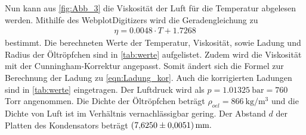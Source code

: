 Nun kann aus \autoref{fig:Abb_3} die Viskosität der Luft für die Temperatur abgelesen werden.
Mithilfe des WebplotDigitizers \cite{Rohatgi2020} wird die Geradengleichung zu
\begin{align*}
       \eta = 0.0048 \cdot T + 1.7268 
\end{align*}
bestimmt.
Die berechneten Werte der Temperatur, Viskosität, sowie Ladung und Radius der Öltröpfchen sind in \autoref{tab:werte} aufgelistet.
Zudem wird die Viskosität mit der Cunningham-Korrektur angepasst. Somit ändert sich die Formel zur Berechnung der Ladung zu \autoref{eqn:Ladung_kor}.
Auch die korrigierten Ladungen sind in \autoref{tab:werte} eingetragen.
Der Luftdruck wird als $p= \qty{1.01325}{\bar} = 760$ \, Torr angenommen.
Die Dichte der Öltröpfchen beträgt $\rho_{oel}= \qty{866}{\kilo\gram\per\cubic\meter}$\cite{V503} und die Dichte von Luft ist im Verhältnis vernachlässigbar gering.
Der Abstand $d$ der Platten des Kondensators beträgt $\qty{7.6250 \pm 0.0051}{\milli\meter}.$\cite{V503}
